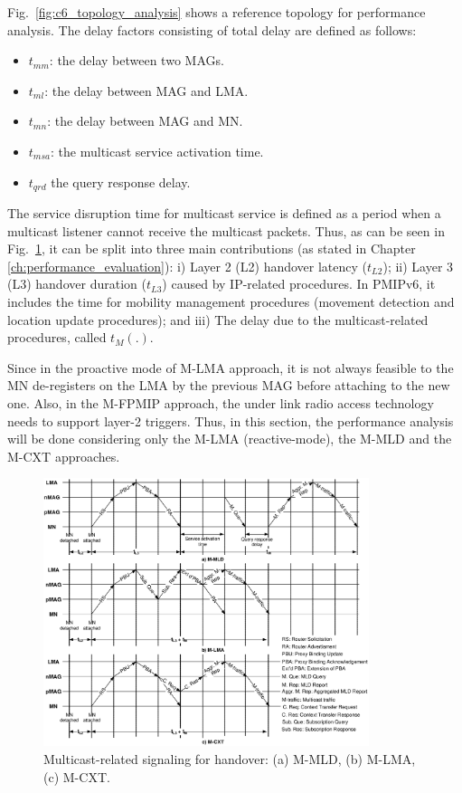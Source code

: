 Fig.~\ref{fig:c6_topology_analysis} shows a reference topology for performance analysis. The delay factors consisting of total
delay are defined as follows:
\setlength \abovedisplayskip{-1pt}
\vspace{-0.1in}
\begin{itemize}
\itemsep 0.07em
\item $t_{mm}$: the delay between two MAGs.
\item $t_{ml}$: the delay between MAG and LMA.
\item $t_{mn}$: the delay between MAG and MN.
\item $t_{msa}$: the multicast service activation time.
\item $t_{qrd}$ the query response delay.
\end{itemize}

The service disruption time for multicast service is defined as a period when a multicast listener cannot receive the multicast packets. Thus, as can be seen in Fig.~\ref{fig:c6_handover}, it can be split into three main contributions (as stated in Chapter \ref{ch:performance_evaluation}): i) Layer 2 (L2) handover latency ($t_{L2}$); ii) Layer 3 (L3) handover duration ($t_{L3}$) caused by IP-related procedures. In PMIPv6, it includes the time for mobility management procedures (movement detection and location update procedures); and iii) The delay due to the multicast-related procedures, called $t_{M}(.)$.

Since in the proactive mode of M-LMA approach, it is not always feasible to the MN de-registers on the LMA by the previous MAG before attaching to the new one. Also, in the M-FPMIP approach, the under link radio access technology needs to support layer-2 triggers. Thus, in this section, the performance analysis will be done considering only the M-LMA (reactive-mode), the M-MLD and the M-CXT approaches. 

\begin{figure}[h!] 
 \begin{center} 
 \includegraphics[width=0.85\textwidth]{./Part2/Chapter4/figures/c6_handover.eps} 
    \caption[Multicast-related signaling when a listener performs a handover inside a PMIPv6 domain.]{Multicast-related signaling for handover: (a) M-MLD, (b) M-LMA, (c) M-CXT.}
     \label{fig:c6_handover}
  \end{center} 
\end{figure}

